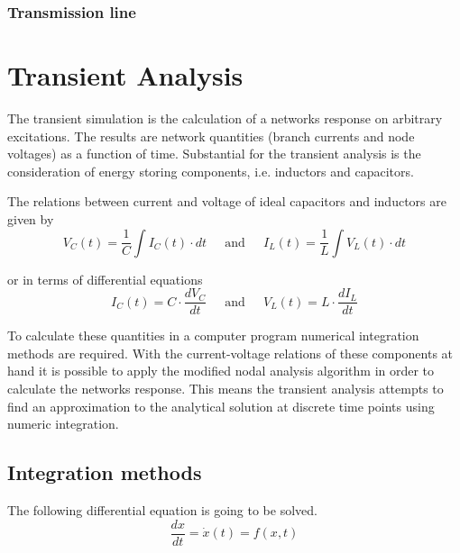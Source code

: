 \documentclass[10pt]{report}
\begin{document}
\subsection{Transmission line}

\chapter{Transient Analysis}

The transient simulation is the calculation of a networks response on
arbitrary excitations.  The results are network quantities (branch
currents and node voltages) as a function of time.  Substantial for
the transient analysis is the consideration of energy storing
components, i.e. inductors and capacitors.

\addvspace{12pt}

The relations between current and voltage of ideal capacitors and
inductors are given by
\begin{equation}
V_C(t) = \dfrac{1}{C}\int I_C(t) \cdot dt
\;\;\;\; \textrm{ and } \;\;\;\;
I_L(t) = \dfrac{1}{L}\int V_L(t) \cdot dt
\end{equation}

or in terms of differential equations
\begin{equation}
I_C(t) = C\cdot \dfrac{d V_C}{d t}
\;\;\;\; \textrm{ and } \;\;\;\;
V_L(t) = L\cdot \dfrac{d I_L}{d t}
\end{equation}

To calculate these quantities in a computer program numerical
integration methods are required.  With the current-voltage relations
of these components at hand it is possible to apply the modified nodal
analysis algorithm in order to calculate the networks response.  This
means the transient analysis attempts to find an approximation to the
analytical solution at discrete time points using numeric integration.

\section{Integration methods}

The following differential equation is going to be solved.
\begin{equation}
\dfrac{d x}{d t} = \dot{x}(t) = f(x,t)
\label{eq:IntEquation}
\end{equation}
\end{document}
